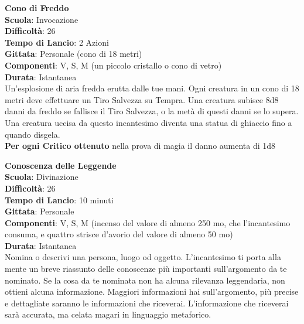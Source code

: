 \begin{multicols}{2}
\medskip\textbf{Cono di Freddo}\\
\textbf{Scuola}: Invocazione\\
\textbf{Difficoltà}: 26\\
\textbf{Tempo di Lancio}: 2 Azioni\\
\textbf{Gittata}: Personale (cono di 18 metri)\\
\textbf{Componenti}: V, S, M (un piccolo cristallo o cono di vetro)\\
\textbf{Durata}: Istantanea\\
Un'esplosione di aria fredda erutta dalle tue mani. Ogni creatura in un cono di 18 metri deve effettuare un Tiro Salvezza su Tempra. Una creatura subisce 8d8 danni da freddo se fallisce il Tiro Salvezza, o la metà di questi danni se lo supera. Una creatura uccisa da questo incantesimo diventa una statua di ghiaccio fino a quando disgela.\\
\textbf{Per ogni Critico ottenuto} nella prova di magia il danno aumenta di 1d8

\medskip\textbf{Conoscenza delle Leggende}\\
\textbf{Scuola}: Divinazione\\
\textbf{Difficoltà}: 26\\
\textbf{Tempo di Lancio}: 10 minuti\\
\textbf{Gittata}: Personale\\
\textbf{Componenti}: V, S, M (incenso del valore di almeno 250 mo, che l'incantesimo consuma, e quattro strisce d'avorio del valore di almeno 50 mo)\\
\textbf{Durata}: Istantanea\\
Nomina o descrivi una persona, luogo od oggetto. L'incantesimo ti porta alla mente un breve riassunto delle conoscenze più importanti sull'argomento da te nominato. Se la cosa da te nominata non ha alcuna rilevanza leggendaria, non ottieni alcuna informazione. Maggiori informazioni hai sull'argomento, più precise e dettagliate saranno le informazioni che riceverai. L'informazione che riceverai sarà accurata, ma celata magari in linguaggio metaforico.


\end{multicols}
